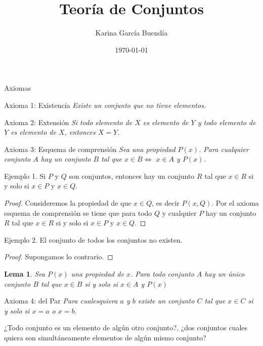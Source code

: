 \documentclass[fc]{tarea}
\title{Teoría de Conjuntos}
\author{Karina García Buendía}
\date{\today}
\newtheorem{lema}{Lema}
\begin{document}
\begin{frame}
\titlepage
\end{frame}

\begin{frame}{Axiomas}
    \begin{block}{Axioma 1: Existencia}
        \textit {Existe un conjunto que no tiene elementos.}
    \end{block}

    \begin{block}{Axioma 2: Extensión}
         \textit {Si todo elemento de $X$ es elemento de $Y$ y todo elemento de $Y$ es elemento de $X$, entonces
         $X =Y$.}
    \end{block}

        \begin{block}{Axioma 3: Esquema de comprensión}
            \textit {Sea una propiedad $P(x)$. Para cualquier conjunto $A$ hay un conjunto $B$ tal que $x \in B \Leftrightarrow$
            $x \in A$ y $P(x)$.} 
        \end{block}
\end{frame}

\begin{frame}
    Ejemplo 1. Si $P$ y $Q$ son conjuntos, entonces hay un conjunto $R$ tal que $x \in R$
    si y solo si $x \in P$ y $x \in Q$.
\pause
    \begin{proof}
        Consideremos la propiedad de que $x \in Q$, es decir $P(x,Q)$. Por el axioma esquema de comprensión se tiene
        que para todo $Q$ y cualquier $P$ hay un conjunto $R$ tal que $x \in R$ si y solo si $x \in P$ y $x \in Q$.
    \end{proof}    
\pause
    Ejemplo 2. El conjunto de todos los conjuntos no existen.
    \begin{proof}
        Supongamos lo contrario.
    \end{proof}
\end{frame}

\begin{frame}
    \begin{lema}
        Sea $P(x)$ una propiedad de $x$. Para todo conjunto $A$ hay un único conjunto $B$ tal que $x \in B$
        si y solo si $x \in A$ y $P(x)$
    \end{lema}
\end{frame}

\begin{frame}
        \begin{block}{Axioma 4: del Par}
            \textit {Para cualesquiera $a$ y $b$ existe un conjunto $C$ tal que $x \in C$ si y solo si $x = a$ o $x = b$.}
        \end{block}

\pause

\vspace{1em}
     ¿Todo conjunto es un elemento de algún otro conjunto?, ¿dos conjuntos cuales quiera son simultáneamente elementos
     de algún mismo conjunto?
\end{frame}
\end{document}

